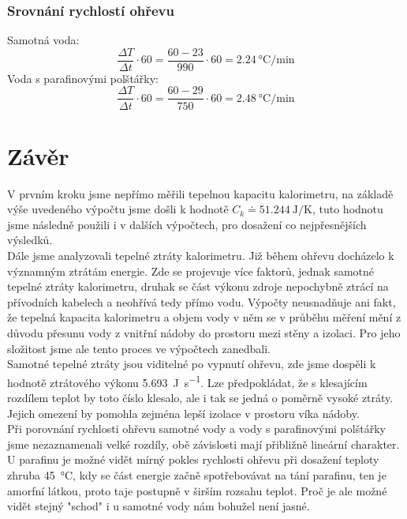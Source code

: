 \documentclass{protokol}
\begin{document}
\subsubsection{Srovnání rychlostí ohřevu}
Samotná voda:
\[
	\frac{\Delta T}{\Delta t}\cdot60= \frac{60-23}{990}\cdot60=\qty{2,24}{\degreeCelsius\per\minute}
\]
Voda s parafinovými polštářky:
\[
	\frac{\Delta T}{\Delta t}\cdot60= \frac{60-29}{750}\cdot60=\qty{2,48}{\degreeCelsius\per\minute}
\]

	\clearpage
\section{Závěr}
	V prvním kroku jsme nepřímo měřili tepelnou kapacitu kalorimetru, na základě výše uvedeného výpočtu jsme došli k hodnotě \(C_k \doteq \qty{51,244}{\joule\per\kelvin}\), tuto hodnotu jsme následně použili i v dalších výpočtech, pro dosažení co nejpřesnějších výsledků. 
\\

	Dále jsme analyzovali tepelné ztráty kalorimetru. Již během ohřevu docházelo k významným ztrátám energie. Zde se projevuje více faktorů, jednak samotné tepelné ztráty kalorimetru, druhak se část výkonu zdroje nepochybně ztrácí na přívodních kabelech a neohřívá tedy přímo vodu. Výpočty neusnadňuje ani fakt, že tepelná kapacita kalorimetru a objem vody v něm se v průběhu měření mění z důvodu přesunu vody z vnitřní nádoby do prostoru mezi stěny a izolaci. Pro jeho složitost jsme ale tento proces ve výpočtech zanedbali.
\\

	Samotné tepelné ztráty jsou viditelné po vypnutí ohřevu, zde jsme dospěli k hodnotě ztrátového výkonu \qty{5,693}{\joule\per\second}. Lze předpokládat, že s klesajícím rozdílem teplot by toto číslo klesalo, ale i tak se jedná o poměrně vysoké ztráty. Jejich omezení by pomohla zejména lepší izolace v prostoru víka nádoby.
\\

	Při porovnání rychlosti ohřevu samotné vody a vody s parafinovými polštářky jsme nezaznamenali velké rozdíly, obě závislosti mají přibližně lineární charakter. U parafinu je možné vidět mírný pokles rychlosti ohřevu při dosažení teploty zhruba \qty{45}{\degreeCelsius}, kdy se část energie začně spotřebovávat na tání parafinu, ten je amorfní látkou, proto taje postupně v širším rozsahu teplot. Proč je ale možné vidět stejný "schod" i u samotné vody nám bohužel není jasné. 
\end{document}
